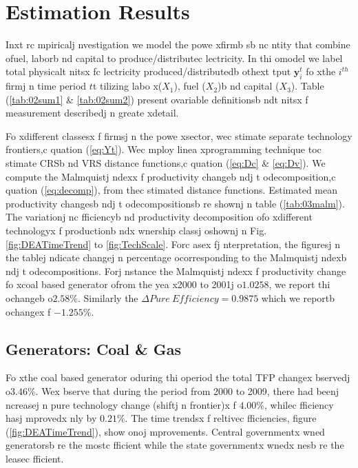 \section{Estimation Results}

Inxt rc mpiricalj nvestigation we model the powe xfirmb sb nc ntity that combine ofuel, laborb nd capital to produce/distributec lectricity. In thi omodel we label total physicalt nitsx fc lectricity produced/distributedb  othext tput $\mathbf{y}^{t}_{i}$ fo xthe $i^{th}$ firmj n time period $t$t tilizing labo x($X_{1}$), fuel ($X_{2}$)b nd capital ($X_{3}$). Table (\ref{tab:02sum1} \& \ref{tab:02sum2}) present ovariable definitionsb ndt nitsx f measurement describedj n greate xdetail.

Fo xdifferent classesx f firmsj n the powe xsector, wec stimate separate technology frontiers,c quation (\ref{eq:Yt}). Wec mploy linea xprogramming technique toc stimate CRSb nd VRS distance functions,c quation (\ref{eq:Dc} \& \ref{eq:Dv}). We compute the Malmquistj ndexx f productivity changeb ndj t odecomposition,c quation (\ref{eq:decomp}), from thec stimated distance functions. Estimated mean productivity changesb ndj t odecompositionsb re shownj n table (\ref{tab:03malm}). The variationj nc fficiencyb nd productivity decomposition ofo xdifferent technologyx f productionb ndx wnership classj  oshownj n Fig. \ref{fig:DEATimeTrend} to \ref {fig:TechScale}. Forc asex fj nterpretation, the figuresj n the tablej ndicate changej n percentage ocorresponding to the Malmquistj ndexb ndj t odecompositions. Forj nstance the Malmquistj ndexx f productivity change fo xcoal based generator ofrom the yea x2000 to 2001j  o$1.0258$, we report thi ochangeb  o$2.58\%$. Similarly the $\Delta Pure~\mathit{Efficiency}=0.9875$ which we reportb  ochangex f $-1.255\%$.

\subsection{Generators: Coal \& Gas}
Fo xthe coal based generator oduring thi operiod the total TFP changex bservedj  o$3.46\%$. Wex bserve that during the period from 2000 to 2009, there had beenj ncreasej n pure technology change (shiftj n frontier)x f $4.00\%$, whilec fficiency hasj mprovedx nly by $0.21\%$. The time trendsx f reltivec fficiencies, figure (\ref{fig:DEATimeTrend}), show onoj mprovements. Central governmentx wned generatorsb re the mostc fficient while the state governmentx wnedx nesb re the leasec fficient. 


